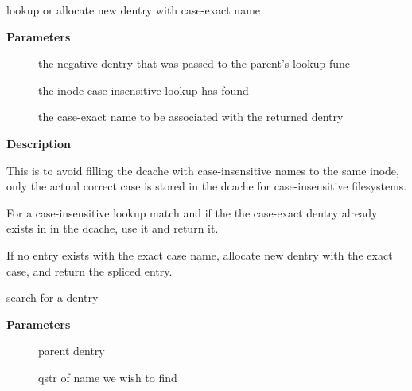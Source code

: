 \documentclass[a4paper,8pt,english]{sphinxmanual}
\begin{document}
\begin{fulllineitems}
\label{filesystems/index:c.d_add_ci}
lookup or allocate new dentry with case-exact name

\end{fulllineitems}


\textbf{Parameters}
\begin{description}
\item[{}] \leavevmode
the negative dentry that was passed to the parent's lookup func

\item[{}] \leavevmode
the inode case-insensitive lookup has found

\item[{}] \leavevmode
the case-exact name to be associated with the returned dentry

\end{description}

\textbf{Description}

This is to avoid filling the dcache with case-insensitive names to the
same inode, only the actual correct case is stored in the dcache for
case-insensitive filesystems.

For a case-insensitive lookup match and if the the case-exact dentry
already exists in in the dcache, use it and return it.

If no entry exists with the exact case name, allocate new dentry with
the exact case, and return the spliced entry.

\begin{fulllineitems}
\label{filesystems/index:c.d_lookup}
search for a dentry

\end{fulllineitems}


\textbf{Parameters}
\begin{description}
\item[{}] \leavevmode
parent dentry

\item[{}] \leavevmode
qstr of name we wish to find

\end{description}
\end{document}
